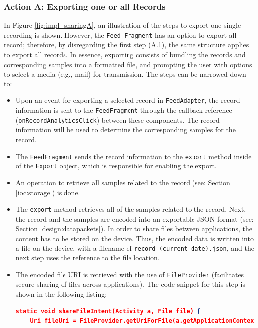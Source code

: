 \subsubsection{Action A: Exporting one or all Records}
In Figure \ref{fig:impl_sharingA}, an illustration of the steps to export one single recording is shown. However, the \verb|Feed Fragment| has an option to export all record; therefore, by disregarding the first step (A.1), the same structure applies to export all records. In essence, exporting consists of bundling the records and corresponding samples into a formatted file, and prompting the user with options to select a media (e.g., mail) for transmission. The steps can be narrowed down to: 

\begin{itemize}
    \item[A.1] Upon an event for exporting a selected record in \verb|FeedAdapter|, the record information is sent to the \verb|FeedFragment| through the callback reference (\verb|onRecordAnalyticsClick|) between these components. The record information will be used to determine the corresponding samples for the record.
    \item[A.2] The \verb|FeedFragment| sends the record information to the \verb|export| method inside of the \verb|Export| object, which is responsible for enabling the export. 
    \item[A.3] An operation to retrieve all samples related to the record (see: Section \ref{ioc:storage}) is done. 
    \item[A.4] The \verb|export| method retrieves all of the samples related to the record. Next, the record and the samples are encoded into an exportable JSON format (see: Section \ref{design:datapackets}). In order to share files between applications, the content has to be stored on the device. Thus, the encoded data is written into a file on the device, with a filename of \verb|record_(current_date).json|, and the next step uses the reference to the file location. 
    \item[A.5] The encoded file URI is retrieved with the use of \verb|FileProvider| (facilitates secure sharing of files across applications). The code snippet for this step is shown in the following listing: 
\begin{lstlisting}[language=json, caption={}, captionpos=b]
static void shareFileIntent(Activity a, File file) {
    Uri fileUri = FileProvider.getUriForFile(a.getApplicationContext(), a.getApplicationContext().getPackageName() + ".provider", file);


\end{lstlisting}
\end{itemize}

